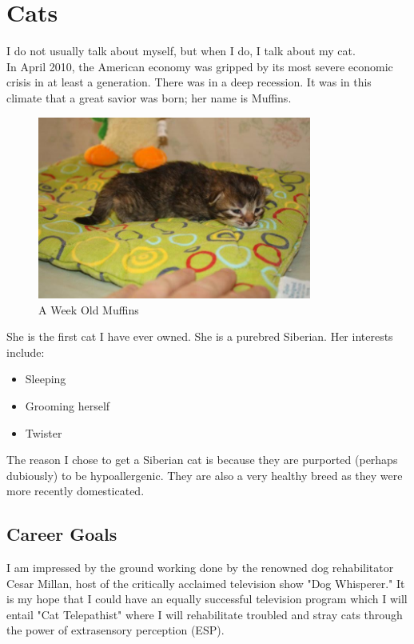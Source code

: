 \chapter{Cats}

I do not usually talk about myself, but when I do, I talk about my cat.\\

In April 2010, the American economy was gripped by its most severe economic crisis in at least a generation.  There was in a deep recession.  It was in this climate that a great savior was born; her name is Muffins.  

\begin{figure}[ht!]
\centering
\includegraphics[width=90mm]{./images/muffins.jpg}
\caption{A Week Old Muffins}
\end{figure}

She is the first cat I have ever owned.  She is a purebred Siberian.  Her interests include: \\
\begin{itemize}
	\item Sleeping
	\item Grooming herself
	\item Twister
\end{itemize}

The reason I chose to get a Siberian cat is because they are purported (perhaps dubiously) to be hypoallergenic. They are also a very healthy breed as they were more recently domesticated.\

\section{Career Goals}

I am impressed by the ground working done by the renowned dog rehabilitator Cesar Millan, host of the critically acclaimed television show "Dog Whisperer." It is my hope that I could have an equally successful television program which I will entail "Cat Telepathist"  where I will rehabilitate troubled and stray cats through the power of extrasensory perception (ESP).

